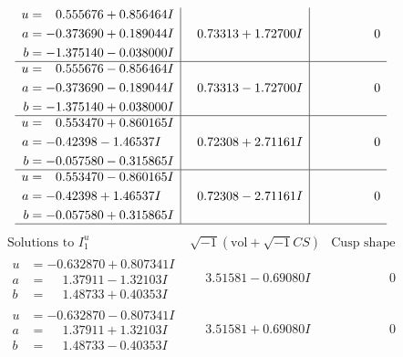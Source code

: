 \documentclass[1p]{elsarticle_modified}
\theoremstyle{definition}
\newcommand{\I}{\sqrt{-1}}
\begin{document}
$$\begin{array}{c|c|c}
\begin{aligned}
u &= \phantom{-}0.555676 + 0.856464 I \\
a &= -0.373690 + 0.189044 I \\
b &= -1.375140 - 0.038000 I\end{aligned}
 & \phantom{-}0.73313 + 1.72700 I & \phantom{-0.000000 } 0 \\ \hline\begin{aligned}
u &= \phantom{-}0.555676 - 0.856464 I \\
a &= -0.373690 - 0.189044 I \\
b &= -1.375140 + 0.038000 I\end{aligned}
 & \phantom{-}0.73313 - 1.72700 I & \phantom{-0.000000 } 0 \\ \hline\begin{aligned}
u &= \phantom{-}0.553470 + 0.860165 I \\
a &= -0.42398 - 1.46537 I \\
b &= -0.057580 - 0.315865 I\end{aligned}
 & \phantom{-}0.72308 + 2.71161 I & \phantom{-0.000000 } 0 \\ \hline\begin{aligned}
u &= \phantom{-}0.553470 - 0.860165 I \\
a &= -0.42398 + 1.46537 I \\
b &= -0.057580 + 0.315865 I\end{aligned}
 & \phantom{-}0.72308 - 2.71161 I & \phantom{-0.000000 } 0\\
 \hline 
 \end{array}$$\newpage$$\begin{array}{c|c|c}  
\text{Solutions to }I^u_{1}& \I (\text{vol} + \sqrt{-1}CS) & \text{Cusp shape}\\
 \hline 
\begin{aligned}
u &= -0.632870 + 0.807341 I \\
a &= \phantom{-}1.37911 - 1.32103 I \\
b &= \phantom{-}1.48733 + 0.40353 I\end{aligned}
 & \phantom{-}3.51581 - 0.69080 I & \phantom{-0.000000 } 0 \\ \hline\begin{aligned}
u &= -0.632870 - 0.807341 I \\
a &= \phantom{-}1.37911 + 1.32103 I \\
b &= \phantom{-}1.48733 - 0.40353 I\end{aligned}
 & \phantom{-}3.51581 + 0.69080 I & \phantom{-0.000000 } 0 \\ \hline\begin{aligned}

\end{aligned}
\end{array}$$
\end{document}
